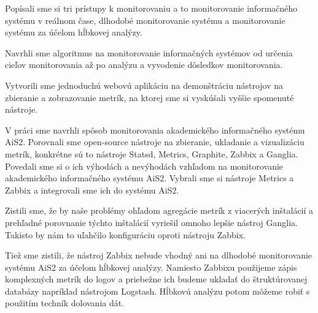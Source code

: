 \documentclass[a4paper, upjsfrontpage, disablespecwarning, thesismargins, thesislinespacing]{rnthesis}
\begin{document}
Popísali sme si tri prístupy k monitorovaniu a to monitorovanie informačného systému v reálnom čase, dlhodobé monitorovanie systému a monitorovanie systému za účelom hĺbkovej analýzy.

Navrhli sme algoritmus na monitorovanie informačných systémov od určenia cieľov monitorovania až po analýzu a vyvodenie dôsledkov monitorovania.

Vytvorili sme jednoduchú webovú aplikáciu na demonštráciu nástrojov na zbieranie a zobrazovanie metrík, na ktorej sme si vyskúšali vyššie spomenuté nástroje.

V práci sme navrhli spôsob monitorovania akademického informačného systému AiS2.
Porovnali sme open-source nástroje na zbieranie, ukladanie a vizualizáciu metrík, konkrétne sú to nástroje Statsd, Metrics, Graphite, Zabbix a Ganglia.
Povedali sme si o ich výhodách a nevýhodách vzhľadom na monitorovanie akademického informačného systému AiS2.
Vybrali sme si nástroje Metrics a Zabbix a integrovali sme ich do systému AiS2.

Zistili sme, že by naše problémy ohľadom agregácie metrík z viacerých inštalácií a prehľadné porovnanie týchto inštalácií vyriešil omnoho lepšie nástroj Ganglia.
Takisto by nám to uľahčilo konfiguráciu oproti nástroju Zabbix.

Tiež sme zistili, že nástroj Zabbix nebude vhodný ani na dlhodobé monitorovanie systému AiS2 za účelom hĺbkovej analýzy.
Namiesto Zabbixu použijeme zápis komplexných metrík do logov a priebežne ich budeme ukladať do štruktúrovanej databázy napríklad nástrojom Logstash.
Hĺbkovú analýzu potom môžeme robiť s použitím techník dolovania dát.





\end{document}
